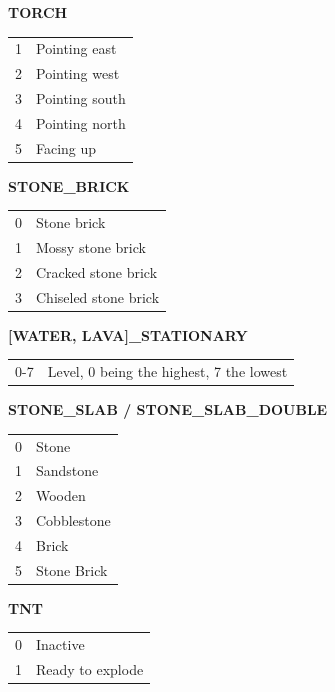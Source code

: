 \documentclass[twocolumn]{geocraft-worksheet-multipage}
\begin{document}
\textbf{TORCH}\vspace{-0.2cm}
\begin{center}
\begin{supertabular} { | r | l | }
1 & Pointing east \\
2 & Pointing west \\
3 & Pointing south \\
4 & Pointing north \\
5 & Facing up \\
\end{supertabular}
\end{center}

\textbf{STONE\_BRICK}\vspace{-0.2cm}
\begin{center}
\begin{supertabular} { | r | l | }
0 & Stone brick \\
1 & Mossy stone brick \\
2 & Cracked stone brick \\
3 & Chiseled stone brick \\
\end{supertabular}
\end{center}

\textbf{[WATER, LAVA]\_STATIONARY}\vspace{-0.2cm}

\begin{center}
\begin{supertabular} { | r | l | }
0-7 & Level, 0 being the highest, 7 the lowest \\
\end{supertabular}
\end{center}
\vspace{3cm}
\textbf{STONE\_SLAB / STONE\_SLAB\_DOUBLE}\vspace{-0.2cm}
\begin{center}
\begin{supertabular} { | r | l | }
0 & Stone \\
1 & Sandstone \\
2 & Wooden \\
3 & Cobblestone \\
4 & Brick \\
5 & Stone Brick \\
\end{supertabular}
\end{center}

\textbf{TNT}\vspace{-0.2cm}
\begin{center}
\begin{supertabular} { | r | l | }
0 & Inactive \\
1 & Ready to explode \\
\end{supertabular}
\end{center}
\end{document}
